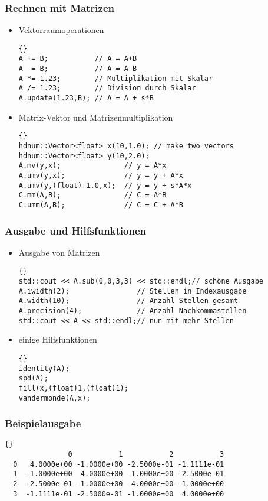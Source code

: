 \begin{frame}[fragile]
\frametitle{Rechnen mit Matrizen}
\begin{itemize}
\item Vektorraumoperationen\\
{\footnotesize{\begin{lstlisting}{}
A += B;           // A = A+B
A -= B;           // A = A-B
A *= 1.23;        // Multiplikation mit Skalar
A /= 1.23;        // Division durch Skalar
A.update(1.23,B); // A = A + s*B
\end{lstlisting}}}
\item Matrix-Vektor und Matrizenmultiplikation\\
{\footnotesize{\begin{lstlisting}{}
hdnum::Vector<float> x(10,1.0); // make two vectors
hdnum::Vector<float> y(10,2.0);
A.mv(y,x);               // y = A*x
A.umv(y,x);              // y = y + A*x
A.umv(y,(float)-1.0,x);  // y = y + s*A*x
C.mm(A,B);               // C = A*B
C.umm(A,B);              // C = C + A*B
\end{lstlisting}}}
\end{itemize}
\end{frame}

\begin{frame}[fragile]
\frametitle{Ausgabe und Hilfsfunktionen}
\begin{itemize}
\item Ausgabe von Matrizen\\
{\footnotesize{\begin{lstlisting}{}
std::cout << A.sub(0,0,3,3) << std::endl;// schöne Ausgabe
A.iwidth(2);                // Stellen in Indexausgabe
A.width(10);                // Anzahl Stellen gesamt
A.precision(4);             // Anzahl Nachkommastellen
std::cout << A << std::endl;// nun mit mehr Stellen
\end{lstlisting}}}
\item einige Hilfsfunktionen
{\footnotesize{\begin{lstlisting}{}
identity(A);
spd(A);
fill(x,(float)1,(float)1);
vandermonde(A,x);
\end{lstlisting}}}
\end{itemize}
\end{frame}

\begin{frame}[fragile]
\frametitle{Beispielausgabe}
{\footnotesize{\begin{lstlisting}{}
               0           1           2           3
  0   4.0000e+00 -1.0000e+00 -2.5000e-01 -1.1111e-01
  1  -1.0000e+00  4.0000e+00 -1.0000e+00 -2.5000e-01
  2  -2.5000e-01 -1.0000e+00  4.0000e+00 -1.0000e+00
  3  -1.1111e-01 -2.5000e-01 -1.0000e+00  4.0000e+00
\end{lstlisting}}}
\end{frame}

